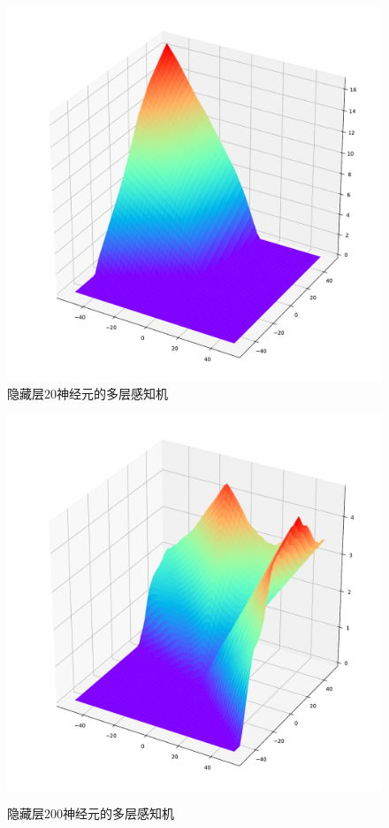 \documentclass[a4paper]{ctexart}
\begin{document}
\begin{spacing}{1.3}
	\begin{figure}[htbp]
		\begin{minipage}[t]{0.5\textwidth}
			\centering
			\includegraphics[width=\textwidth, keepaspectratio]{figure/MLP1.pdf}\\
		\caption{隐藏层20神经元的多层感知机}\label{figure:MLP1}
		\end{minipage}%
		\hfill
		\begin{minipage}[t]{0.5\textwidth}
			\centering
			\includegraphics[width=\textwidth, keepaspectratio]{figure/MLP2.pdf}\\
		\caption{隐藏层200神经元的多层感知机}\label{figure:MLP2}
		\end{minipage}
	\end{figure}


\end{spacing}
\end{document}
